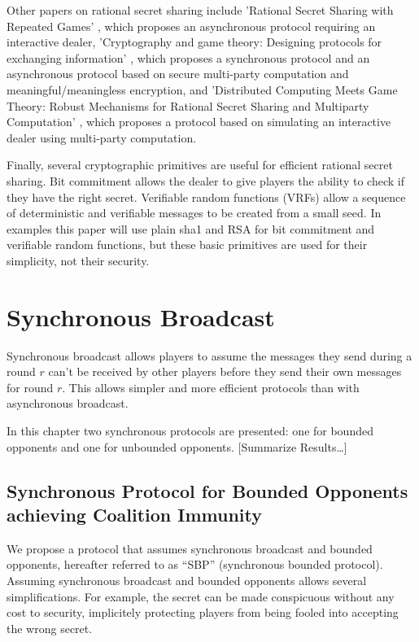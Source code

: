\documentclass{dalcsthesis}
\begin{document}
Other papers on rational secret sharing include 'Rational Secret Sharing with Repeated Games' \cite{maleka08}, which proposes an asynchronous protocol requiring an interactive dealer, 'Cryptography and game theory: Designing protocols for exchanging information' \cite{kol08-2}, which proposes a synchronous protocol and an asynchronous protocol based on secure multi-party computation and meaningful/meaningless encryption, and 'Distributed Computing Meets Game Theory: Robust Mechanisms for Rational Secret Sharing and Multiparty Computation' \cite{abraham06}, which proposes a protocol based on simulating an interactive dealer using multi-party computation.

Finally, several cryptographic primitives are useful for efficient rational secret sharing. Bit commitment \cite{naor91} allows the dealer to give players the ability to check if they have the right secret. Verifiable random functions (VRFs) \cite{micali99, dis05} allow a sequence of deterministic and verifiable messages to be created from a small seed. In examples this paper will use plain sha1 and RSA for bit commitment and verifiable random functions, but these basic primitives are used for their simplicity, not their security.

\chapter{Synchronous Broadcast}

Synchronous broadcast allows players to assume the messages they send during a round $r$ can't be received by other players before they send their own messages for round $r$. This allows simpler and more efficient protocols than with asynchronous broadcast.

In this chapter two synchronous protocols are presented: one for bounded opponents and one for unbounded opponents. [Summarize Results\ldots]

\section{Synchronous Protocol for Bounded Opponents achieving Coalition Immunity}

We propose a protocol that assumes synchronous broadcast and bounded opponents, hereafter referred to as ``SBP'' (synchronous bounded protocol). Assuming synchronous broadcast and bounded opponents allows several simplifications. For example, the secret can be made conspicuous without any cost to security, implicitely protecting players from being fooled into accepting the wrong secret.
\end{document}
